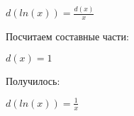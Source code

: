 $ d(ln(x)) = \frac{d(x)}{x}$

Посчитаем составные части:

$ d(x) = 1$

Получилось:

$ d(ln(x)) = \frac{1}{x}$

